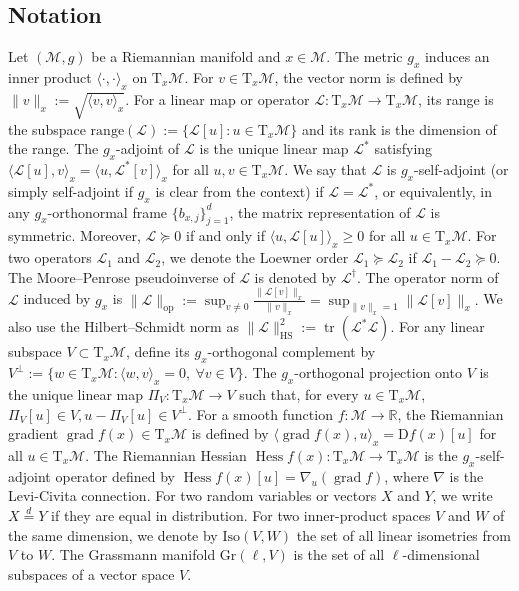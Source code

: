 \documentclass[final,onefignum,onetabnum]{siamart250211}
\DeclareMathOperator{\grad}{grad}
\newcommand{\Hess}{\operatorname{Hess}}
\begin{document}
\subsection{Notation}
  Let $(\mathcal M,g)$ be a Riemannian manifold and $x\in\mathcal M$.
  The metric \(g_x\) induces an inner product \(\langle\cdot,\cdot\rangle_x\) on \(\mathrm{T}_x\mathcal M\). For \(v\in \mathrm{T}_x\mathcal M\), the vector norm is defined by
$
\|v\|_x:=\sqrt{\langle v,v\rangle_x}.
$
For a linear map or operator $\mathcal{L}:\mathrm{T}_x\mathcal M\to \mathrm{T}_x\mathcal M$, its range is the subspace $\mathrm{range}(\mathcal{L}) := \{\mathcal{L}[u]: u\in \mathrm{T}_x\mathcal M\}$ and its rank is the dimension of the range.
The $g_x$-adjoint of $\mathcal{L}$ is the unique linear map $\mathcal{L}^{*}$ satisfying
$
\langle \mathcal{L}[u],v\rangle_x=\langle u,\mathcal{L}^{*}[v]\rangle_x
$
for all $u,v\in \mathrm{T}_x\mathcal M$.
  We say that $\mathcal{L}$ is {$g_x$-self-adjoint} (or simply self-adjoint if $g_x$ is clear from the context) if $\mathcal{L}=\mathcal{L}^{*}$, or equivalently, in any $g_x$-orthonormal frame $\{b_{x, j}\}_{j=1}^d$, the matrix representation of $\mathcal{L}$ is symmetric.
  Moreover, $\mathcal{L}\succeq 0$ if and only if $\langle u,\mathcal{L}[u]\rangle_x\ge 0$ for all $u\in \mathrm{T}_x\mathcal M$.
  For two operators $\mathcal{L}_1$ and $\mathcal{L}_2$, we denote the Loewner order $\mathcal{L}_1 \succeq \mathcal{L}_2$ if $\mathcal{L}_1-\mathcal{L}_2 \succeq 0$.
  The Moore--Penrose pseudoinverse of $\mathcal{L}$ is denoted by $\mathcal{L}^{\dagger}$.
The operator norm of \(\mathcal{L}\) induced by \(g_x\) is
$
\|\mathcal{L}\|_{\mathrm{op}}:=\sup_{v\neq 0}\frac{\|\mathcal{L}[v]\|_x}{\|v\|_x}=\sup_{\|v\|_x=1}\|\mathcal{L}[v]\|_x.
$
We also use the Hilbert--Schmidt norm as
$
\|\mathcal{L}\|_{\mathrm{HS}}^{2}:=\operatorname{tr}(\mathcal{L}^{*}\mathcal{L}).
$
For any linear subspace \(V\subset \mathrm T_x\mathcal M\), define its \(g_x\)-orthogonal complement by
$
V^{\perp}:=\{w\in \mathrm T_x\mathcal M:\langle w,v\rangle_x=0,\ \forall v\in V\}.
$
The \(g_x\)-orthogonal projection onto \(V\) is the unique linear map
$
\Pi_V:\mathrm T_x\mathcal M\to V
$
such that, for every \(u\in \mathrm T_x\mathcal M\),
$
\Pi_V[u]\in V,
u-\Pi_V[u]\in V^{\perp}.
$
For a smooth function $f:\mathcal M\to\mathbb R$, the Riemannian gradient $\grad f(x)\in \mathrm{T}_x\mathcal M$ is defined by $\langle \grad f(x),u\rangle_x=\mathrm D f(x)[u]$ for all $u\in \mathrm{T}_x\mathcal M$. The Riemannian Hessian $\Hess f(x):\mathrm{T}_x\mathcal M\to \mathrm{T}_x\mathcal M$ is the $g_x$-self-adjoint operator defined by $\Hess f(x)[u]=\nabla_u(\grad f)$, where $\nabla$ is the Levi-Civita connection. 
For two random variables or vectors $X$ and $Y$, we write $X\stackrel{d}{=}Y$ if they are equal in distribution. For two inner-product spaces $V$ and $W$ of the same dimension, we denote by $\mathrm{Iso}(V,W)$ the set of all linear isometries from $V$ to $W$. The Grassmann manifold $\mathrm{Gr}(\ell,V)$ is the set of all $\ell$-dimensional subspaces of a vector space $V$.
\end{document}
